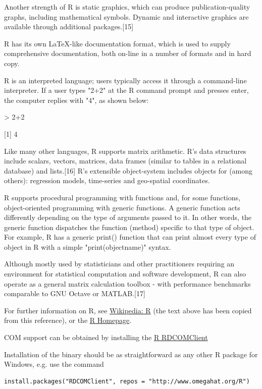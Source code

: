 \vpara
Another strength of R is static graphics, which can produce publication-quality graphs, including mathematical symbols. Dynamic and interactive graphics are available through additional packages.[15]

\vpara
R has its own LaTeX-like documentation format, which is used to supply comprehensive documentation, both on-line in a number of formats and in hard copy.

\vpara
R is an interpreted language; users typically access it through a command-line interpreter. If a user types "2+2" at the R command prompt and presses enter, the computer replies with "4", as shown below:

> 2+2

[1] 4

\vpara
Like many other languages, R supports matrix arithmetic. R's data structures include scalars, vectors, matrices, data frames (similar to tables in a relational database) and lists.[16] R's extensible object-system includes objects for (among others): regression models, time-series and geo-spatial coordinates.

\vpara
R supports procedural programming with functions and, for some functions, object-oriented programming with generic functions. A generic function acts differently depending on the type of arguments passed to it. In other words, the generic function dispatches the function (method) specific to that type of object. For example, R has a generic print() function that can print almost every type of object in R with a simple "print(objectname)" syntax.

\vpara
Although mostly used by statisticians and other practitioners requiring an environment for statistical computation and software development, R can also operate as a general matrix calculation toolbox - with performance benchmarks comparable to GNU Octave or MATLAB.[17]

\vpara
For further information on R, see \href{http://en.wikipedia.org/wiki/R_(programming_language)}{Wikipedia: R} (the text above has been copied from this reference), or the  \href{http://www.r-project.org/}{R Homepage}.

\vpara
COM support can be obtained by installing the \href{http://www.omegahat.org/RDCOMClient/}{R RDCOMClient} 

Installation of the binary should be as straightforward as any other R package for Windows, e.g. use the command 

\begin{verbatim} 
install.packages("RDCOMClient", repos = "http://www.omegahat.org/R")
\end{verbatim}

